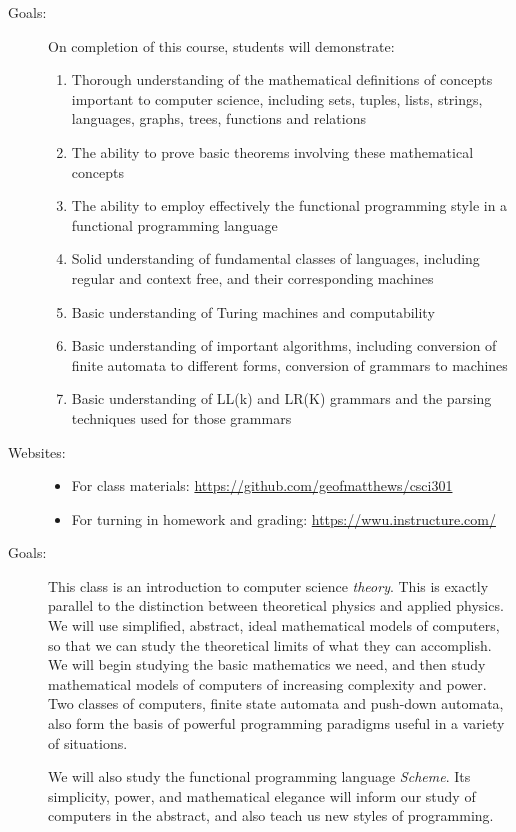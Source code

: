 \documentclass{article}
\begin{document}
\begin{description}
\item[Goals:]  On completion of this course, students will demonstrate:
\begin{enumerate}
\item
Thorough understanding of the mathematical definitions of concepts
important to computer science, including sets, tuples, lists, strings,
languages, graphs, trees, functions and relations
\item
The ability to prove basic theorems involving these
mathematical concepts
\item
The ability to employ effectively the functional programming style in a
functional programming language
\item
Solid understanding of fundamental classes of languages, including
regular and context free, and their corresponding machines
\item
Basic understanding of Turing machines and computability
\item
Basic understanding of important algorithms, including conversion of
finite automata to different forms, conversion of grammars to machines
\item
Basic understanding of LL(k) and LR(K) grammars and the parsing
techniques used for those grammars
\end{enumerate}

\item[Websites:]\mbox{}
\begin{itemize}
  \item For class materials: \url{https://github.com/geofmatthews/csci301}
  \item For turning in homework and
    grading: \url{https://wwu.instructure.com/} 
\end{itemize}


\item[Goals:] This class is an introduction to computer science {\em
    theory}.  This is exactly parallel to the distinction between
  theoretical physics and applied physics.  We will use simplified,
  abstract, ideal mathematical models of computers, so that we can
  study the theoretical limits of what they can accomplish.  We will
  begin studying the basic mathematics we need, and then study
  mathematical models of computers of increasing complexity and power.
  Two classes of computers, finite state automata and push-down
  automata, also form the basis of powerful programming paradigms
  useful in a variety of situations.

  We will also study the functional programming language {\em Scheme}.
  Its simplicity, power, and mathematical elegance will inform our
  study of computers in the abstract, and also teach us new styles of
  programming.


\end{description}
\end{document}
